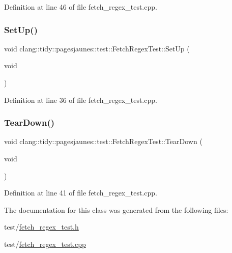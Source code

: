 Definition at line 46 of file fetch\+\_\+regex\+\_\+test.\+cpp.

\mbox{\label{classclang_1_1tidy_1_1pagesjaunes_1_1test_1_1_fetch_regex_test_ae96c5d042140c690da3decd805595303}} 
\subsubsection{\texorpdfstring{Set\+Up()}{SetUp()}}
{\footnotesize\ttfamily void clang\+::tidy\+::pagesjaunes\+::test\+::\+Fetch\+Regex\+Test\+::\+Set\+Up (\begin{DoxyParamCaption}\item[{void}]{ }\end{DoxyParamCaption})\hspace{0.3cm}{\ttfamily [virtual]}}



Definition at line 36 of file fetch\+\_\+regex\+\_\+test.\+cpp.

\mbox{\label{classclang_1_1tidy_1_1pagesjaunes_1_1test_1_1_fetch_regex_test_ac036eea590bd85744269af0eae8f456e}} 
\subsubsection{\texorpdfstring{Tear\+Down()}{TearDown()}}
{\footnotesize\ttfamily void clang\+::tidy\+::pagesjaunes\+::test\+::\+Fetch\+Regex\+Test\+::\+Tear\+Down (\begin{DoxyParamCaption}\item[{void}]{ }\end{DoxyParamCaption})\hspace{0.3cm}{\ttfamily [virtual]}}



Definition at line 41 of file fetch\+\_\+regex\+\_\+test.\+cpp.



The documentation for this class was generated from the following files\+:\begin{DoxyCompactItemize}
\item 
test/\hyperlink{fetch__regex__test_8h}{fetch\+\_\+regex\+\_\+test.\+h}\item 
test/\hyperlink{fetch__regex__test_8cpp}{fetch\+\_\+regex\+\_\+test.\+cpp}\end{DoxyCompactItemize}

